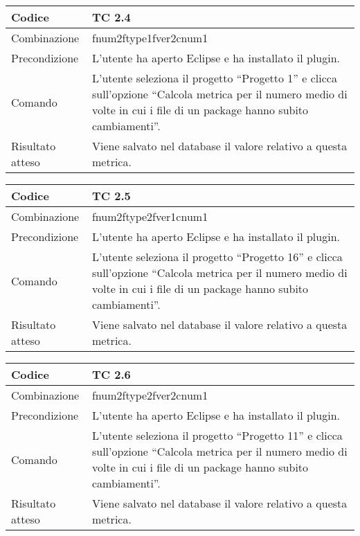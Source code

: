 \begin{table}[ht]
\begin{tabular}{|p{3cm}|p{9cm}|}
\hline
\cellcolor{lightgray}Codice				& TC 2.4								\\
\hline
\cellcolor{lightgray}Combinazione		& fnum2ftype1fver2cnum1									\\
\hline
\cellcolor{lightgray}Precondizione		& L'utente ha aperto Eclipse e ha installato il plugin.		\\
\hline
\cellcolor{lightgray}Comando			& L'utente seleziona il progetto ``Progetto 1''  e clicca sull'opzione ``Calcola metrica per il numero medio di volte in cui i file di un package hanno subito cambiamenti''.	\\
\hline
\cellcolor{lightgray}Risultato atteso	& Viene salvato nel database il valore relativo a questa metrica.\\
\hline
\end{tabular}
\end{table}

\begin{table}[ht]
\begin{tabular}{|p{3cm}|p{9cm}|}
\hline
\cellcolor{lightgray}Codice				& TC 2.5								\\
\hline
\cellcolor{lightgray}Combinazione		& fnum2ftype2fver1cnum1								\\
\hline
\cellcolor{lightgray}Precondizione		& L'utente ha aperto Eclipse e ha installato il plugin.		\\
\hline
\cellcolor{lightgray}Comando			& L'utente seleziona il progetto ``Progetto 16''  e clicca sull'opzione ``Calcola metrica per il numero medio di volte in cui i file di un package hanno subito cambiamenti''.	\\
\hline
\cellcolor{lightgray}Risultato atteso	& Viene salvato nel database il valore relativo a questa metrica.\\
\hline
\end{tabular}
\end{table}

\begin{table}[ht]
\begin{tabular}{|p{3cm}|p{9cm}|}
\hline
\cellcolor{lightgray}Codice				& TC 2.6								\\
\hline
\cellcolor{lightgray}Combinazione		& fnum2ftype2fver2cnum1								\\
\hline
\cellcolor{lightgray}Precondizione		& L'utente ha aperto Eclipse e ha installato il plugin.		\\
\hline
\cellcolor{lightgray}Comando			& L'utente seleziona il progetto ``Progetto 11''  e clicca sull'opzione ``Calcola metrica per il numero medio di volte in cui i file di un package hanno subito cambiamenti''.	\\
\hline
\cellcolor{lightgray}Risultato atteso	& Viene salvato nel database il valore relativo a questa metrica.\\
\hline
\end{tabular}
\end{table}

